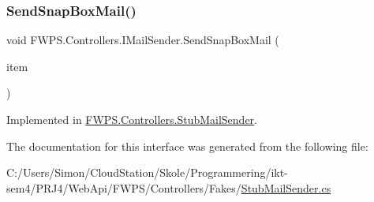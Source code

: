 \subsubsection{\texorpdfstring{Send\+Snap\+Box\+Mail()}{SendSnapBoxMail()}}
{\footnotesize\ttfamily void F\+W\+P\+S.\+Controllers.\+I\+Mail\+Sender.\+Send\+Snap\+Box\+Mail (\begin{DoxyParamCaption}\item[{\mbox{\hyperlink{class_f_w_p_s_1_1_models_1_1_snap_box_item}{Snap\+Box\+Item}}}]{item }\end{DoxyParamCaption})}



Implemented in \mbox{\hyperlink{class_f_w_p_s_1_1_controllers_1_1_stub_mail_sender_a6830add052b5fcb2bde3aefc2678d532}{F\+W\+P\+S.\+Controllers.\+Stub\+Mail\+Sender}}.



The documentation for this interface was generated from the following file\+:\begin{DoxyCompactItemize}
\item 
C\+:/\+Users/\+Simon/\+Cloud\+Station/\+Skole/\+Programmering/ikt-\/sem4/\+P\+R\+J4/\+Web\+Api/\+F\+W\+P\+S/\+Controllers/\+Fakes/\mbox{\hyperlink{_stub_mail_sender_8cs}{Stub\+Mail\+Sender.\+cs}}\end{DoxyCompactItemize}
